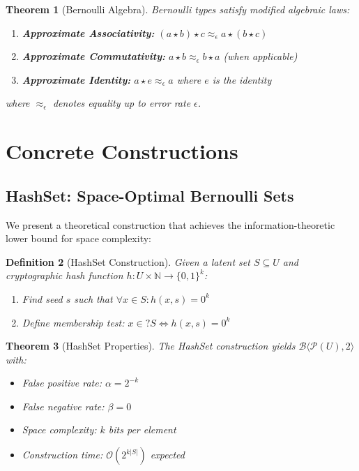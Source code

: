 \documentclass[11pt,final,hidelinks]{article}
\newtheorem{theorem}{Theorem}[section]
\newtheorem{definition}[theorem]{Definition}
\newcommand{\bernoulli}[2]{\mathcal{B}\langle #1, #2 \rangle}
\newcommand{\powerset}[1]{\mathcal{P}(#1)}
\begin{document}
\begin{theorem}[Bernoulli Algebra]
Bernoulli types satisfy modified algebraic laws:
\begin{enumerate}
    \item \textbf{Approximate Associativity:} $(a \star b) \star c \approx_\epsilon a \star (b \star c)$
    \item \textbf{Approximate Commutativity:} $a \star b \approx_\epsilon b \star a$ (when applicable)
    \item \textbf{Approximate Identity:} $a \star e \approx_\epsilon a$ where $e$ is the identity
\end{enumerate}
where $\approx_\epsilon$ denotes equality up to error rate $\epsilon$.
\end{theorem}

\section{Concrete Constructions}

\subsection{HashSet: Space-Optimal Bernoulli Sets}

We present a theoretical construction that achieves the information-theoretic lower bound for space complexity:

\begin{definition}[HashSet Construction]
Given a latent set $S \subseteq U$ and cryptographic hash function $h: U \times \mathbb{N} \to \{0,1\}^k$:
\begin{enumerate}
    \item Find seed $s$ such that $\forall x \in S: h(x, s) = 0^k$
    \item Define membership test: $x \in? S \iff h(x, s) = 0^k$
\end{enumerate}
\end{definition}

\begin{theorem}[HashSet Properties]
The HashSet construction yields $\bernoulli{\powerset{U}}{2}$ with:
\begin{itemize}
    \item False positive rate: $\alpha = 2^{-k}$
    \item False negative rate: $\beta = 0$
    \item Space complexity: $k$ bits per element
    \item Construction time: $\mathcal{O}(2^{k|S|})$ expected
\end{itemize}
\end{theorem}
\end{document}
